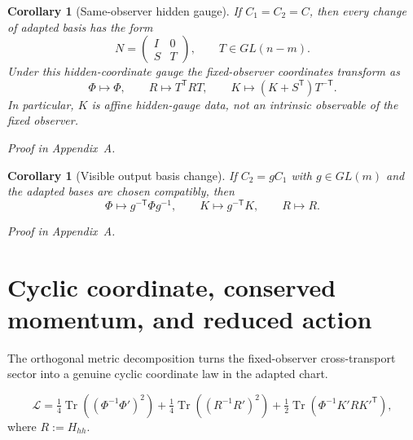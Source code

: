 \documentclass[11pt,a4paper]{article}
\numberwithin{equation}{section}
\DeclareMathOperator{\Tr}{Tr}
\theoremstyle{thmcompact}
\newtheorem{corollary}[theorem]{Corollary}
\theoremstyle{remark}
\newcommand{\proofappendix}{\par{\hfill\scriptsize\emph{Proof in Appendix~A.}}\par}
\begin{document}
\begin{corollary}[Same-observer hidden gauge]
\label{cor:hidden-gauge}
If $C_1=C_2=C$, then every change of adapted basis has the form
\begin{equation}
N=
\begin{pmatrix}
I & 0\\
S & T
\end{pmatrix},
\qquad
T\in GL(n-m).
\label{eq:N-same-observer}
\end{equation}
Under this hidden-coordinate gauge the fixed-observer coordinates transform as
\begin{equation}
\Phi\mapsto \Phi,
\qquad
R\mapsto T^{\mathsf T}RT,
\qquad
K\mapsto (K+S^{\mathsf T})T^{-\mathsf T}.
\label{eq:hidden-gauge-action}
\end{equation}
In particular, $K$ is affine hidden-gauge data, not an intrinsic observable of the fixed observer.
\end{corollary}

\proofappendix

\begin{corollary}[Visible output basis change]
\label{cor:visible-gauge}
If $C_2=gC_1$ with $g\in GL(m)$ and the adapted bases are chosen compatibly, then
\begin{equation}
\Phi\mapsto g^{-\mathsf T}\Phi g^{-1},
\qquad
K\mapsto g^{-\mathsf T}K,
\qquad
R\mapsto R.
\label{eq:visible-gauge-action}
\end{equation}
\end{corollary}

\proofappendix

\section{Cyclic coordinate, conserved momentum, and reduced action}

The orthogonal metric decomposition turns the fixed-observer cross-transport sector into a genuine cyclic coordinate law in the adapted chart.

\begin{equation}
\mathcal L
=
\tfrac14\Tr((\Phi^{-1}\Phi')^2)
+
\tfrac14\Tr((R^{-1}R')^2)
+
\tfrac12\Tr(\Phi^{-1}K'R K'^{\mathsf T}),
\label{eq:geodesic-Lagrangian}
\end{equation}
where $R:=H_{hh}$.
\end{document}
